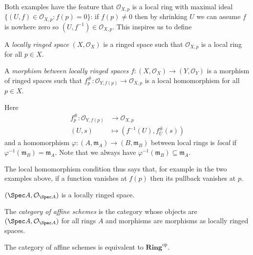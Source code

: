 \documentclass[a4paper]{article}
\renewcommand{\c}[1]{\mathbf{#1}} %
\newcommand{\sh}[1]{\mathcal{#1}} %
\begin{document}
Both examples have the feature that \(\sh O_{X, p}\) is a local ring with maximal ideal \(\{(U, f) \in \sh O_{X, p}: f(p) = 0\}\): if \(f(p) \neq 0\) then by shrinking \(U\) we can assume \(f\) is nowhere zero so \((U, f^{-1}) \in \sh O_{X, p}\). This inspires us to define

\begin{definition}
  A \emph{locally ringed space} \((X, \sh O_X)\) is a ringed space such that \(\sh O_{X, p}\) is a local ring for all \(p \in X\).

  A \emph{morphism between locally ringed spaces} \(f: (X, \sh O_X) \to (Y, \sh O_Y)\) is a morphism of ringed spaces such that \(f_p^\#: \sh O_{Y, f(p)} \to \sh O_{X, p}\) is a local homomorphism for all \(p \in X\).
\end{definition}
Here
\begin{align*}
  f_p^\#: \sh O_{Y, f(p)} &\to \sh O_{X, p} \\
  (U, s) &\mapsto (f^{-1}(U), f_U^\#(s))
\end{align*}
and a homomorphism \(\varphi: (A, \mathfrak m_A) \to (B, \mathfrak m_B)\) between local rings is \emph{local} if \(\varphi^{-1}(\mathfrak m_B) = \mathfrak m_A\). Note that we always have \(\varphi^{-1}(\mathfrak m_B) \subseteq \mathfrak m_A\).

The local homomorphism condition thus says that, for example in the two examples above, if a function vanishes at \(f(p)\) then its pullback vanishes at \(p\).

\begin{eg}
  \((\Spec A, \sh O_{\Spec A})\) is a locally ringed space.
\end{eg}

\begin{definition}
  The \emph{category of affine schemes} is the category whose objects are \((\Spec A, \sh O_{\Spec A})\) for all rings \(A\) and morphisms are morphisms as locally ringed spaces.
\end{definition}

\begin{theorem}
  The category of affine schemes is equivalent to \(\c{Ring}^{\mathrm{op}}\).
\end{theorem}
\end{document}
